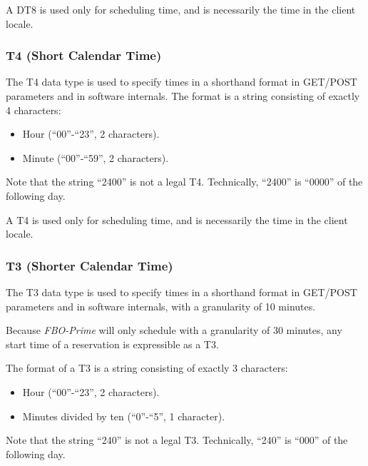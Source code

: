 \documentclass[letterpaper,10pt,titlepage]{article}
\newcommand{\productbasename}{FBO-Prime}
\begin{document}
A DT8 is used only for scheduling time, and is necessarily the time in the
client locale.



\subsubsection{T4 (Short Calendar Time)}
\label{stdd0:sdty0:sdtt4}

%
The T4 data type is used to specify times in a shorthand
format in GET/POST parameters and in software internals.
The format is a string consisting of exactly 4
characters:

\begin{itemize}
\item Hour (``00''-``23'', 2 characters).
\item Minute (``00''-``59'', 2 characters).
\end{itemize}

Note that the string ``2400'' is not a legal T4\@.  Technically, ``2400'' is
``0000'' of the following day.

A T4 is used only for scheduling time, and is necessarily the time in the
client locale.


\subsubsection{T3 (Shorter Calendar Time)}
\label{stdd0:sdty0:sdtt3}

%
The T3 data type is used to specify times in a shorthand
format in GET/POST parameters and in software internals, with
a granularity of 10 minutes.

Because \emph{\productbasename{}} will only schedule with a granularity
of 30 minutes, any start time of a reservation is expressible as a T3.

The format of a T3 is a string consisting of exactly 3
characters:

\begin{itemize}
\item Hour (``00''-``23'', 2 characters).
\item Minutes divided by ten (``0''-``5'', 1 character).
\end{itemize}

Note that the string ``240'' is not a legal T3\@.  Technically, ``240'' is
``000'' of the following day.
\end{document}
